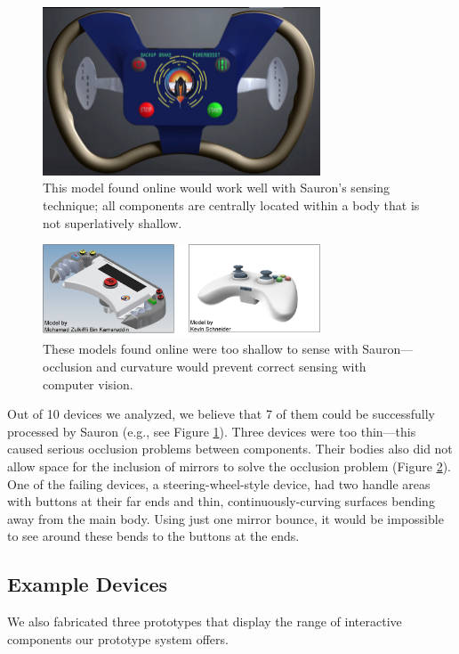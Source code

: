     \begin{figure}
\centering
\includegraphics[width=3.25in]{figures/sauron/reasonable-model.png}
\caption{This model found online would work well with Sauron's sensing technique; all components are centrally located within a body that is not superlatively shallow.}
\label{fig:sauron-wouldwork}
\end{figure}

    \begin{figure}
\centering
\includegraphics[width=3.25in]{figures/sauron/shallow-models.png}
\caption{These models found online were too shallow to sense with Sauron---occlusion and curvature would prevent correct sensing with computer vision.}
\label{fig:sauron-premade}
\end{figure}

    Out of 10 devices we analyzed, we believe that 7 of them could be successfully processed by Sauron (e.g., see Figure \ref{fig:sauron-wouldwork}). Three devices were too thin---this caused serious occlusion problems between components. Their bodies also did not allow space for the inclusion of mirrors to solve the occlusion problem (Figure \ref{fig:sauron-premade}). One of the failing devices, a steering-wheel-style device, had two handle areas with buttons at their far ends and thin, continuously-curving surfaces bending away from the main body. Using just one mirror bounce, it would be impossible to see around these bends to the buttons at the ends.


    \subsection{Example Devices}
    We also fabricated three prototypes that display the range of interactive components our prototype system offers.

